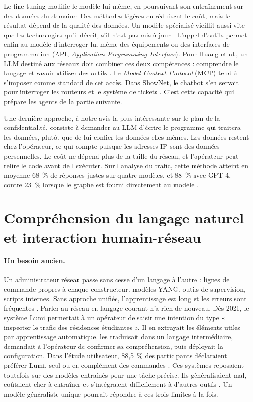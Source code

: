 Le fine-tuning modifie le modèle lui-même, en poursuivant son entraînement sur des données du domaine. Des méthodes légères en réduisent le coût, mais le résultat dépend de la qualité des données. Un modèle spécialisé vieillit aussi vite que les technologies qu'il décrit, s'il n'est pas mis à jour \cite{huang2024}. L'appel d'outils permet enfin au modèle d'interroger lui-même des équipements ou des interfaces de programmation (API, \emph{Application Programming Interface}). Pour Huang et al., un LLM destiné aux réseaux doit combiner ces deux compétences : comprendre le langage et savoir utiliser des outils \cite{huang2024}. Le \emph{Model Context Protocol} (MCP) tend à s'imposer comme standard de cet accès. Dans ShowNet, le chatbot s'en servait pour interroger les routeurs et le système de tickets \cite{nakamura2026}. C'est cette capacité qui prépare les agents de la partie suivante.

Une dernière approche, à notre avis la plus intéressante sur le plan de la confidentialité, consiste à demander au LLM d'écrire le programme qui traitera les données, plutôt que de lui confier les données elles-mêmes. Les données restent chez l'opérateur, ce qui compte puisque les adresses IP sont des données personnelles. Le coût ne dépend plus de la taille du réseau, et l'opérateur peut relire le code avant de l'exécuter. Sur l'analyse du trafic, cette méthode atteint en moyenne 68~\% de réponses justes sur quatre modèles, et 88~\% avec GPT-4, contre 23~\% lorsque le graphe est fourni directement au modèle \cite{mani2023}.

\section{Compréhension du langage naturel et interaction humain-réseau}

\paragraph{Un besoin ancien.}
Un administrateur réseau passe sans cesse d'un langage à l'autre : lignes de commande propres à chaque constructeur, modèles YANG, outils de supervision, scripts internes. Sans approche unifiée, l'apprentissage est long et les erreurs sont fréquentes \cite{mani2023}. Parler au réseau en langage courant n'a rien de nouveau. Dès 2021, le système Lumi permettait à un opérateur de saisir une intention du type « inspecter le trafic des résidences étudiantes ». Il en extrayait les éléments utiles par apprentissage automatique, les traduisait dans un langage intermédiaire, demandait à l'opérateur de confirmer sa compréhension, puis déployait la configuration. Dans l'étude utilisateur, 88,5~\% des participants déclaraient préférer Lumi, seul ou en complément des commandes \cite{jacobs2021}. Ces systèmes reposaient toutefois sur des modèles entraînés pour une tâche précise. Ils généralisaient mal, coûtaient cher à entraîner et s'intégraient difficilement à d'autres outils \cite{huang2024}. Un modèle généraliste unique pourrait répondre à ces trois limites à la fois.

